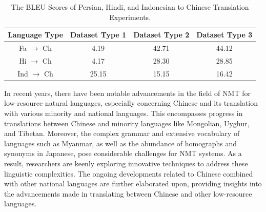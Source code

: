\documentclass[acmsmall]{acmart}
\begin{document}
\begin{table}[h!]
\centering
\caption{The BLEU Scores of Persian, Hindi, and Indonesian to Chinese Translation Experiments.}
\label{Liu}
\begin{tabular}{cccc}
\toprule
Language Type & Dataset Type 1 & Dataset Type 2 & Dataset Type 3 \\
\midrule
Fa $\rightarrow$ Ch & 4.19 & 42.71 & 44.12 \\
Hi $\rightarrow$ Ch & 4.17 & 28.30 & 28.85 \\
Ind $\rightarrow$ Ch & 25.15 & 15.15 & 16.42 \\
\bottomrule
\end{tabular}
\end{table}

%



In recent years, there have been notable advancements in the field of NMT for low-resource natural languages, especially concerning Chinese and its translation with various minority and national languages. This encompasses progress in translations between Chinese and minority languages like Mongolian, Uyghur, and Tibetan. Moreover, the complex grammar and extensive vocabulary of languages such as Myanmar, as well as the abundance of homographs and synonyms in Japanese, pose considerable challenges for NMT systems. As a result, researchers are keenly exploring innovative techniques to address these linguistic complexities. The ongoing developments related to Chinese combined with other national languages are further elaborated upon, providing insights into the advancements made in translating between Chinese and other low-resource languages.
\end{document}
